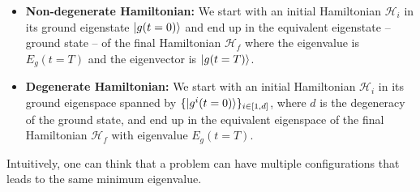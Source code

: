 \begin{itemize}
    \item \textbf{Non-degenerate Hamiltonian:} We start with an initial Hamiltonian $\mathcal{H}_{i}$ in its ground eigenstate $\ket{g(t=0)}$ and end up in the equivalent eigenstate -- ground state -- of the final Hamiltonian $\mathcal{H}_{f}$ where the eigenvalue is $E_{g}(t=T)$ and the eigenvector is $\ket{g(t=T)}$.
    \item \textbf{Degenerate Hamiltonian:} We start with an initial Hamiltonian $\mathcal{H}_{i}$ in its ground eigenspace spanned by $\{\ket{g^{i}(t=0)}\}_{i \in \left[1,d\right]}$, where $d$ is the degeneracy of the ground state, and end up in the equivalent eigenspace of the final Hamiltonian $\mathcal{H}_{f}$ with eigenvalue $E_{g}(t=T)$.
\end{itemize}
Intuitively, one can think that a problem can have multiple configurations that leads to the same minimum eigenvalue.
